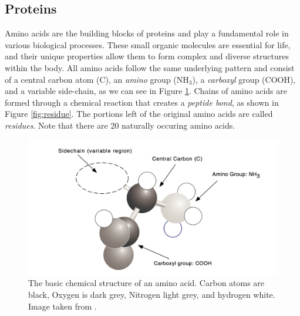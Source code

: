 \subsection{Proteins}
Amino acids are the building blocks of proteins and play a fundamental role in various biological processes. These small organic molecules are essential for life, and their unique properties allow them to form complex and diverse structures within the body. 
All amino acids follow the same underlying pattern and consist of a central carbon atom (C), an \textit{amino} group ($\text{NH}_3$), a \textit{carboxyl} group (COOH), and a variable side-chain, as we can see in Figure \ref{fig:amino-acid}.
Chains of amino acids are formed through a chemical reaction that creates a \textit{peptide bond}, as shown in Figure \ref{fig:residue}. The portions left of the original amino acids are called \textit{residues}. Note that there are 20 naturally occuring amino acids.
\begin{figure}
    \centering
    \includegraphics[scale=0.5]{figures/amino-acid.png}
    \caption{The basic chemical structure of an amino acid. Carbon atoms are black, Oxygen is dark grey, Nitrogen light grey, and hydrogen white. Image taken from \cite{hunter1993molecular}.}
    \label{fig:amino-acid}
\end{figure}

